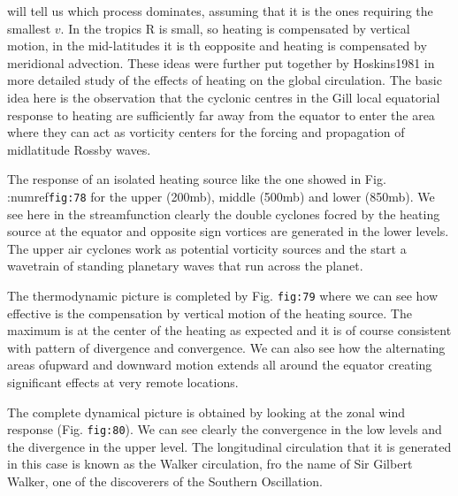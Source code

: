 will tell us which process dominates, assuming that it is the ones
requiring the smallest \(v\). In the tropics R is small, so heating is
compensated by vertical motion, in the mid-latitudes it is th eopposite
and heating is compensated by meridional advection. These ideas were
further put together by Hoskins1981 in more detailed study of the
effects of heating on the global circulation. The basic idea here is the
observation that the cyclonic centres in the Gill local equatorial
response to heating are sufficiently far away from the equator to enter
the area where they can act as vorticity centers for the forcing and
propagation of midlatitude Rossby waves.

The response of an isolated heating source like the one showed in Fig.
:numref\texttt{fig:78} for the upper (200mb), middle (500mb) and lower
(850mb). We see here in the streamfunction clearly the double cyclones
focred by the heating source at the equator and opposite sign vortices
are generated in the lower levels. The upper air cyclones work as
potential vorticity sources and the start a wavetrain of standing
planetary waves that run across the planet.

The thermodynamic picture is completed by Fig. \texttt{fig:79} where we
can see how effective is the compensation by vertical motion of the
heating source. The maximum is at the center of the heating as expected
and it is of course consistent with pattern of divergence and
convergence. We can also see how the alternating areas ofupward and
downward motion extends all around the equator creating significant
effects at very remote locations.

The complete dynamical picture is obtained by looking at the zonal wind
response (Fig. \texttt{fig:80}). We can see clearly the convergence in
the low levels and the divergence in the upper level. The longitudinal
circulation that it is generated in this case is known as the Walker
circulation, fro the name of Sir Gilbert Walker, one of the discoverers
of the Southern Oscillation.

